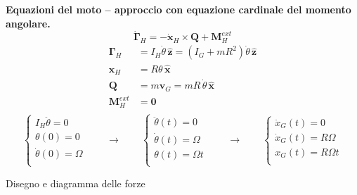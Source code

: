 \begin{example}
    \noindent
    \textbf{Equazioni del moto -- approccio con equazione cardinale del momento angolare.}
    \begin{equation}
        \dot{\mathbf{\Gamma}}_H = - \dot{\mathbf{x}}_H \times \mathbf{Q} + \mathbf{M}_H^{ext}
    \end{equation}
    \begin{equation}
        \begin{aligned}
            \mathbf{\Gamma}_H & = I_H \dot{\theta} \, \mathbf{\hat{z}} = \left( I_G + m R^2 \right) \dot{\theta} \, \mathbf{\hat{z}} \\
            \mathbf{x}_H & = R \theta \, \mathbf{\hat{x}} \\
            \mathbf{Q}   & = m \mathbf{v}_G = m R \, \dot{\theta} \, \mathbf{\hat{x}} \\
            \mathbf{M}_H^{ext} & = \mathbf{0} \\
        \end{aligned}
    \end{equation}
    \begin{equation}
        \begin{cases}
            I_H \ddot{\theta} = 0 \\
            \theta(0) = 0 \\
            \dot{\theta}(0) = \Omega \\
        \end{cases}
        \qquad \rightarrow \qquad
        \begin{cases}
            \ddot{\theta}(t) = 0 \\
            \dot{ \theta}(t) = \Omega \\
                  \theta (t) = \Omega t \\
        \end{cases}
        \qquad \rightarrow \qquad
        \begin{cases}
            \ddot{x}_{G}(t) = 0 \\
            \dot{ x}_{G}(t) = R \Omega \\
                 {x}_{G}(t) = R \Omega t \\
        \end{cases}
    \end{equation}

\end{example}
\begin{example}
    {\color{red} Disegno e diagramma delle forze}

\end{example}
